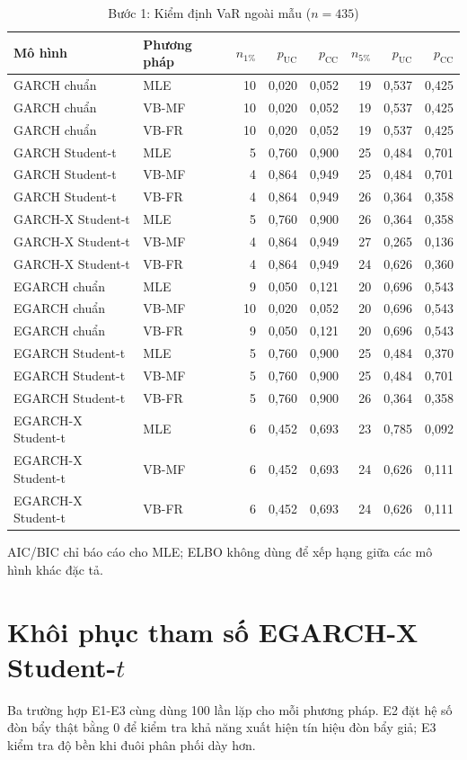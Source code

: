 \documentclass[11pt,a4paper]{article}
\begin{document}
\begin{table}[H]\centering\footnotesize
\caption{Bước 1: Kiểm định VaR ngoài mẫu ($n=435$)}\label{tab:b1-var}
\begin{tabular}{l l r r r r r r}
\toprule
\textbf{Mô hình} & \textbf{Phương pháp} & $n_{1\%}$ & $p_{\text{UC}}$ & $p_{\text{CC}}$ & $n_{5\%}$ & $p_{\text{UC}}$ & $p_{\text{CC}}$ \\
\midrule
GARCH chuẩn & MLE & 10 & 0,020 & 0,052 & 19 & 0,537 & 0,425 \\
GARCH chuẩn & VB-MF & 10 & 0,020 & 0,052 & 19 & 0,537 & 0,425 \\
GARCH chuẩn & VB-FR & 10 & 0,020 & 0,052 & 19 & 0,537 & 0,425 \\
GARCH Student-t & MLE & 5 & 0,760 & 0,900 & 25 & 0,484 & 0,701 \\
GARCH Student-t & VB-MF & 4 & 0,864 & 0,949 & 25 & 0,484 & 0,701 \\
GARCH Student-t & VB-FR & 4 & 0,864 & 0,949 & 26 & 0,364 & 0,358 \\
GARCH-X Student-t & MLE & 5 & 0,760 & 0,900 & 26 & 0,364 & 0,358 \\
GARCH-X Student-t & VB-MF & 4 & 0,864 & 0,949 & 27 & 0,265 & 0,136 \\
GARCH-X Student-t & VB-FR & 4 & 0,864 & 0,949 & 24 & 0,626 & 0,360 \\
EGARCH chuẩn & MLE & 9 & 0,050 & 0,121 & 20 & 0,696 & 0,543 \\
EGARCH chuẩn & VB-MF & 10 & 0,020 & 0,052 & 20 & 0,696 & 0,543 \\
EGARCH chuẩn & VB-FR & 9 & 0,050 & 0,121 & 20 & 0,696 & 0,543 \\
EGARCH Student-t & MLE & 5 & 0,760 & 0,900 & 25 & 0,484 & 0,370 \\
EGARCH Student-t & VB-MF & 5 & 0,760 & 0,900 & 25 & 0,484 & 0,701 \\
EGARCH Student-t & VB-FR & 5 & 0,760 & 0,900 & 26 & 0,364 & 0,358 \\
EGARCH-X Student-t & MLE & 6 & 0,452 & 0,693 & 23 & 0,785 & 0,092 \\
EGARCH-X Student-t & VB-MF & 6 & 0,452 & 0,693 & 24 & 0,626 & 0,111 \\
EGARCH-X Student-t & VB-FR & 6 & 0,452 & 0,693 & 24 & 0,626 & 0,111 \\
\bottomrule
\end{tabular}
\end{table}
AIC/BIC chỉ báo cáo cho MLE; ELBO không dùng để xếp hạng giữa các mô hình khác đặc tả.

\section{Khôi phục tham số EGARCH-X Student-$t$}
Ba trường hợp E1-E3 cùng dùng 100 lần lặp cho mỗi phương pháp. E2 đặt hệ số đòn bẩy thật bằng 0 để kiểm tra khả năng xuất hiện tín hiệu đòn bẩy giả; E3 kiểm tra độ bền khi đuôi phân phối dày hơn.
\end{document}
